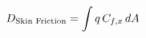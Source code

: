 \documentclass[preview]{standalone}
\begin{document}
\begin{align*}
\special{dvisvgm:raw <g id='unique000'>}D_{\text{Skin Friction}} = \int q\,C_{f,x}\,dA\special{dvisvgm:raw </g>}
\end{align*}
\end{document}
